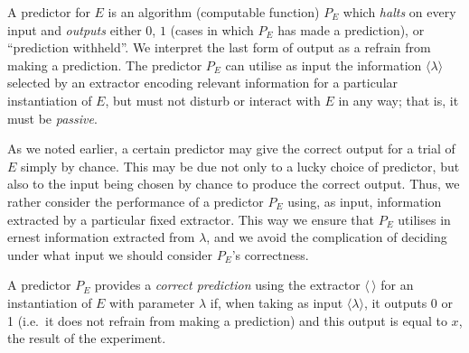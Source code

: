 \documentclass[%
 superscriptaddress,
 preprint,
 showpacs,
 showkeys,
 preprintnumbers,
  amsmath,amssymb,
  aps,
 pra,
  longbibliography,
  floatfix,
 ]{revtex4-1}
\theoremstyle{definition}
\begin{document}
A predictor for $E$ is an algorithm  (computable function) $P_E$
which \emph{halts} on every input and \emph{outputs} either $0$, $1$ (cases in which  $P_E$ has made a prediction), or ``prediction withheld''.
We interpret the last form of output as a refrain from making a prediction.
The predictor
$P_E$ can utilise as input the information $\langle\lambda\rangle$ selected by an extractor
encoding  relevant information for a particular instantiation of $E$, but %
must not disturb or interact with $E$ in any way;
that is, it must be \emph{passive}.


As we noted earlier, a certain predictor may give the correct output for a trial of $E$ simply by chance.
This may be due not only to a lucky choice of predictor, but also to the input being chosen by chance to produce the correct output.
Thus, we rather  consider the performance of a predictor $P_E$  using, as input, information extracted by a particular fixed extractor.
This way we ensure that $P_E$ utilises in ernest information extracted from $\lambda$,
and we avoid the complication of deciding under what input we should consider $P_E$'s correctness.

A predictor $P_E$ provides a \emph{correct prediction} using the extractor $\langle \, \rangle$ for an instantiation of $E$ with parameter $\lambda$ if, %
when taking as input $\langle \lambda \rangle$,
it outputs 0 or 1 (i.e.\ it does not refrain from making a prediction) and this output is equal to $x$, the result of the experiment.
\end{document}
